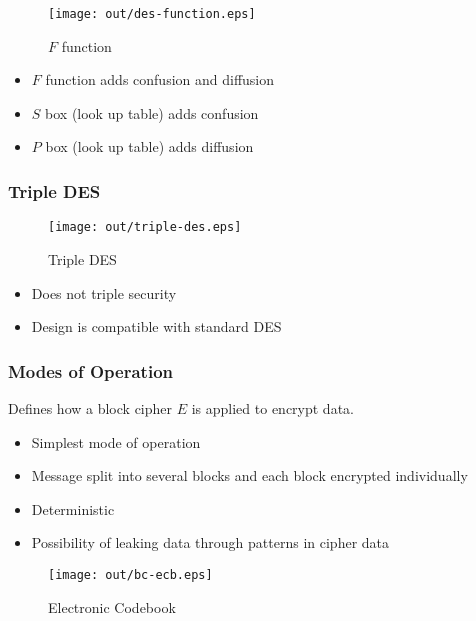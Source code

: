 \documentclass[a4paper]{article}
\begin{document}
\begin{figure}[h!]
  \centering
  \texttt{[image: out/des-function.eps]}
  \caption{$F$ function}
  \label{fig:des-function}
\end{figure}
\FloatBarrier

\begin{itemize}
  \item $F$ function adds confusion and diffusion
  \item $S$ box (look up table) adds confusion
  \item $P$ box (look up table) adds diffusion
\end{itemize}

\subsubsection{Triple DES}

\begin{figure}[h!]
  \centering
  \texttt{[image: out/triple-des.eps]}
  \caption{Triple DES}
  \label{fig:triple-des}
\end{figure}
\FloatBarrier

\begin{itemize}
  \item Does not triple security
  \item Design is compatible with standard DES
\end{itemize}

\subsubsection{Modes of Operation}

Defines how a block cipher $E$ is applied to encrypt data.


\begin{itemize}
  \item Simplest mode of operation
  \item Message split into several blocks and each block encrypted individually
  \item Deterministic
  \item Possibility of leaking data through patterns in cipher data
\end{itemize}

\begin{figure}[h!]
  \centering
  \texttt{[image: out/bc-ecb.eps]}
  \caption{Electronic Codebook}
  \label{fig:bc-ecb}
\end{figure}
\FloatBarrier
\end{document}
